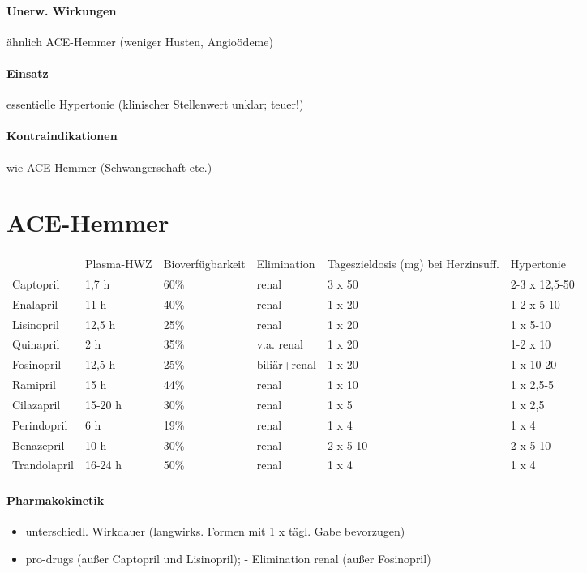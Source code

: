 \documentclass[10pt,a4paper]{report}
\begin{document}
\paragraph{Unerw. Wirkungen} ähnlich ACE-Hemmer (weniger Husten, Angioödeme)
\paragraph{Einsatz} essentielle Hypertonie (klinischer Stellenwert unklar; teuer!)
\paragraph{Kontraindikationen} wie ACE-Hemmer (Schwangerschaft etc.)
\section{ACE-Hemmer}
\begin{tabularx}{\textwidth}{XXXXXX}
&Plasma-HWZ&Bioverfügbarkeit&Elimination&Tageszieldosis (mg) bei Herzinsuff.&Hypertonie\\
Captopril&1,7 h&60\%&renal&3 x 50&2-3 x 12,5-50\\
Enalapril&11 h&40\%&renal&1 x 20&1-2 x 5-10\\
Lisinopril&12,5 h&25\%&renal&1 x 20&1 x 5-10\\
Quinapril&2 h&35\%&v.a. renal&1 x 20&1-2 x 10\\
Fosinopril&12,5 h&25\%&biliär+renal&1 x 20&1 x 10-20\\
Ramipril&15 h&44\%&renal&1 x 10&1 x 2,5-5\\
Cilazapril&15-20 h&30\%&renal&1 x 5&1 x 2,5\\
Perindopril&6 h&19\%&renal&1 x 4&1 x 4\\
Benazepril&10 h&30\%&renal&2 x 5-10&2 x 5-10\\
Trandolapril&16-24 h&50\%&renal&1 x 4&1 x 4\\
\end{tabularx}
\paragraph{Pharmakokinetik}
\begin{itemize}
	\item unterschiedl. Wirkdauer (langwirks. Formen mit 1 x tägl. Gabe bevorzugen)
	\item pro-drugs (außer Captopril und Lisinopril); - Elimination renal (außer Fosinopril)
\end{itemize}
\end{document}
